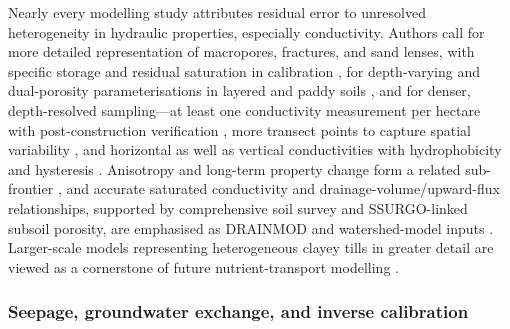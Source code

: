 Nearly every modelling study attributes residual error to unresolved
heterogeneity in hydraulic properties, especially conductivity. Authors call for
more detailed representation of macropores, fractures, and sand lenses, with
specific storage and residual saturation in calibration
\parencite{DeSchepper2017}, for depth-varying and dual-porosity parameterisations
in layered and paddy soils \parencite{Wesström2003,Karandish2018}, and for
denser, depth-resolved sampling---at least one conductivity measurement per
hectare with post-construction verification \parencite{PalaciosVélez2004}, more
transect points to capture spatial variability \parencite{Messing2006}, and
horizontal as well as vertical conductivities with hydrophobicity and hysteresis
\parencite{Tähtikarhu2025}. Anisotropy and long-term property change form a
related sub-frontier \parencite{Akis2015,Moustafa1998,Koivusalo1999}, and
accurate saturated conductivity and drainage-volume/upward-flux relationships,
supported by comprehensive soil survey and SSURGO-linked subsoil porosity, are
emphasised as DRAINMOD and watershed-model inputs
\parencite{DeBoer2006,Schilling2015}. Larger-scale models representing
heterogeneous clayey tills in greater detail are viewed as a cornerstone of
future nutrient-transport modelling \parencite{DeSchepper2015}.

\subsubsection{Seepage, groundwater exchange, and inverse calibration}

